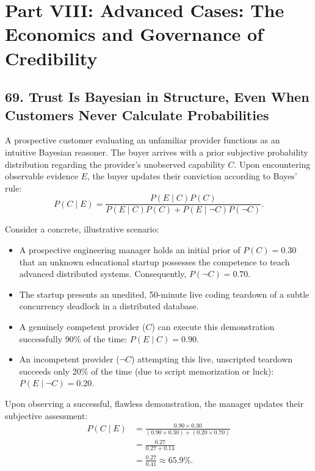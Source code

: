 \section*{Part VIII: Advanced Cases: The Economics and Governance of Credibility}

\subsection*{69. Trust Is Bayesian in Structure, Even When Customers Never Calculate Probabilities}

A prospective customer evaluating an unfamiliar provider functions as an intuitive Bayesian reasoner. The buyer arrives with a prior subjective probability distribution regarding the provider's unobserved capability $C$. Upon encountering observable evidence $E$, the buyer updates their conviction according to Bayes' rule:
\begin{equation}
P(C \mid E) = \frac{P(E \mid C) P(C)}{P(E \mid C) P(C) + P(E \mid \neg C) P(\neg C)}.
\end{equation}

Consider a concrete, illustrative scenario:
\begin{itemize}
\item A prospective engineering manager holds an initial prior of $P(C) = 0.30$ that an unknown educational startup possesses the competence to teach advanced distributed systems. Consequently, $P(\neg C) = 0.70$.
\item The startup presents an unedited, 50-minute live coding teardown of a subtle concurrency deadlock in a distributed database.
\item A genuinely competent provider ($C$) can execute this demonstration successfully 90\% of the time: $P(E \mid C) = 0.90$.
\item An incompetent provider ($\neg C$) attempting this live, unscripted teardown succeeds only 20\% of the time (due to script memorization or luck): $P(E \mid \neg C) = 0.20$.
\end{itemize}

Upon observing a successful, flawless demonstration, the manager updates their subjective assessment:
\begin{equation}
\begin{aligned}
P(C \mid E) &= \frac{0.90 \times 0.30}{(0.90 \times 0.30) + (0.20 \times 0.70)} \\
&= \frac{0.27}{0.27 + 0.14} \\
&= \frac{0.27}{0.41} \approx \mathbf{65.9\%}.
\end{aligned}
\end{equation}

